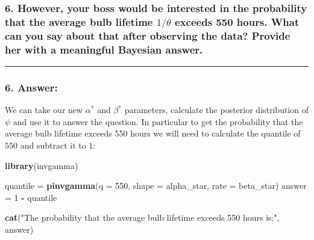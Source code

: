 \documentclass[
]{article}
\newenvironment{Shaded}{\begin{snugshade}}{\end{snugshade}}
\newcommand{\AttributeTok}[1]{\textcolor[rgb]{0.13,0.29,0.53}{#1}}
\newcommand{\DecValTok}[1]{\textcolor[rgb]{0.00,0.00,0.81}{#1}}
\newcommand{\FunctionTok}[1]{\textcolor[rgb]{0.13,0.29,0.53}{\textbf{#1}}}
\newcommand{\NormalTok}[1]{#1}
\newcommand{\OtherTok}[1]{\textcolor[rgb]{0.56,0.35,0.01}{#1}}
\newcommand{\SpecialCharTok}[1]{\textcolor[rgb]{0.81,0.36,0.00}{\textbf{#1}}}
\newcommand{\StringTok}[1]{\textcolor[rgb]{0.31,0.60,0.02}{#1}}
\begin{document}
\hypertarget{however-your-boss-would-be-interested-in-the-probability-that-the-average-bulb-lifetime-1theta-exceeds-550-hours.-what-can-you-say-about-that-after-observing-the-data-provide-her-with-a-meaningful-bayesian-answer.}{%
\subsubsection{\texorpdfstring{6. However, your boss would be interested
in the probability that the average bulb lifetime \(1/\theta\) exceeds
550 hours. What can you say about that after observing the data? Provide
her with a meaningful Bayesian
answer.}{6. However, your boss would be interested in the probability that the average bulb lifetime 1/\textbackslash theta exceeds 550 hours. What can you say about that after observing the data? Provide her with a meaningful Bayesian answer.}}\label{however-your-boss-would-be-interested-in-the-probability-that-the-average-bulb-lifetime-1theta-exceeds-550-hours.-what-can-you-say-about-that-after-observing-the-data-provide-her-with-a-meaningful-bayesian-answer.}}

\begin{center}\rule{0.5\linewidth}{0.5pt}\end{center}

\hypertarget{answer-9}{%
\subsubsection{6. Answer:}\label{answer-9}}

We can take our new \(\alpha^*\) and \(\beta^*\) parameters, calculate
the posterior distribution of \(\psi\) and use it to answer the
question. In particular to get the probability that the average bulb
lifetime exceeds 550 hours we will need to calculate the quantile of
\(550\) and subtract it to \(1\):

\begin{Shaded}
\begin{Highlighting}[]
\FunctionTok{library}\NormalTok{(invgamma)}

\NormalTok{quantile }\OtherTok{=} \FunctionTok{pinvgamma}\NormalTok{(}\AttributeTok{q =} \DecValTok{550}\NormalTok{, }\AttributeTok{shape =}\NormalTok{ alpha\_star, }\AttributeTok{rate =}\NormalTok{ beta\_star)}
\NormalTok{answer }\OtherTok{=} \DecValTok{1} \SpecialCharTok{{-}}\NormalTok{ quantile}

\FunctionTok{cat}\NormalTok{(}\StringTok{"The probability that the average bulb lifetime exceeds 550 hours is:"}\NormalTok{,}
\NormalTok{    answer)}
\end{Highlighting}
\end{Shaded}
\end{document}
